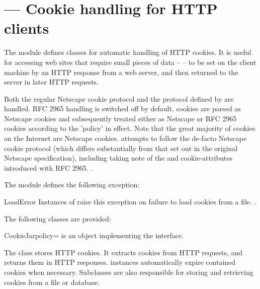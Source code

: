 \section{ ---
         Cookie handling for HTTP clients}




The  module defines classes for automatic handling
of HTTP cookies.  It is useful for accessing web sites that require
small pieces of data --  -- to be set on the client
machine by an HTTP response from a web server, and then returned to
the server in later HTTP requests.

Both the regular Netscape cookie protocol and the protocol defined by
 are handled.  RFC 2965 handling is switched off by default.
 cookies are parsed as Netscape cookies and subsequently
treated either as Netscape or RFC 2965 cookies according to the
'policy' in effect.  Note that the great majority of cookies on the
Internet are Netscape cookies.   attempts to follow
the de-facto Netscape cookie protocol (which differs substantially
from that set out in the original Netscape specification), including
taking note of the  and  cookie-attributes
introduced with RFC 2965.  .


The module defines the following exception:

\begin{excdesc}{LoadError}
Instances of  raise this exception on failure to
load cookies from a file.  .
\end{excdesc}


The following classes are provided:

\begin{classdesc}{CookieJar}{policy=}
 is an object implementing the 
interface.

The  class stores HTTP cookies.  It extracts cookies
from HTTP requests, and returns them in HTTP responses.
 instances automatically expire contained cookies
when necessary.  Subclasses are also responsible for storing and
retrieving cookies from a file or database.
\end{classdesc}

